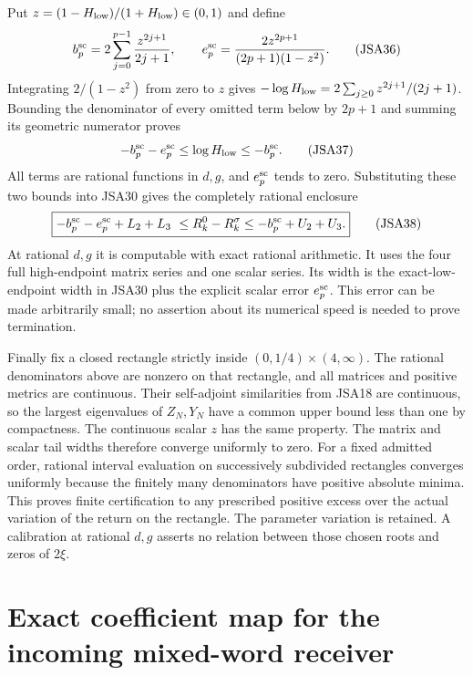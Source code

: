 \documentclass[11pt,a4paper]{article}
\begin{document}
Put $z=(1-H_{\rm low})/(1+H_{\rm low})\in(0,1)$ and define
\[
 b_p^{\rm sc}=2\sum_{j=0}^{p-1}\frac{z^{2j+1}}{2j+1},\qquad
 e_p^{\rm sc}=\frac{2z^{2p+1}}{(2p+1)(1-z^2)}.
\tag{JSA36}
\]
Integrating $2/(1-z^2)$ from zero to $z$ gives
$-\log H_{\rm low}=2\sum_{j\geq0}z^{2j+1}/(2j+1)$.
Bounding the denominator of every omitted term below by
$2p+1$ and summing its geometric numerator proves
\[
 -b_p^{\rm sc}-e_p^{\rm sc}
   \leq\log H_{\rm low}\leq-b_p^{\rm sc}.
\tag{JSA37}
\]
All terms are rational functions in $d,g$, and $e_p^{\rm sc}$
tends to zero. Substituting these two bounds into JSA30 gives
the completely rational enclosure
\[
 \boxed{-b_p^{\rm sc}-e_p^{\rm sc}+L_2+L_3
 \ \leq R_k^0-R_k^\sigma\leq
 -b_p^{\rm sc}+U_2+U_3.}
\tag{JSA38}
\]
At rational $d,g$ it is computable with exact rational arithmetic.
It uses the four full high-endpoint matrix series and one scalar
series. Its width is the exact-low-endpoint width in JSA30 plus
the explicit scalar error $e_p^{\rm sc}$. This error can be made
arbitrarily small; no assertion about its numerical speed is
needed to prove termination.

Finally fix a closed rectangle strictly inside
$(0,1/4)\times(4,\infty)$. The rational denominators above are
nonzero on that rectangle, and all matrices and positive
metrics are continuous. Their self-adjoint similarities from
JSA18 are continuous, so the largest eigenvalues of $Z_N,Y_N$
have a common upper bound less than one by compactness. The
continuous scalar $z$ has the same property. The matrix and
scalar tail widths therefore converge uniformly to zero.
For a fixed admitted order, rational interval evaluation on
successively subdivided rectangles converges uniformly because
the finitely many denominators have positive absolute minima.
This proves finite certification to any prescribed positive
excess over the actual variation of the return on the rectangle.
The parameter variation is retained. A calibration at rational
$d,g$ asserts no relation between those chosen roots and zeros
of $2\xi$.

\section{Exact coefficient map for the incoming mixed-word receiver}
\end{document}
